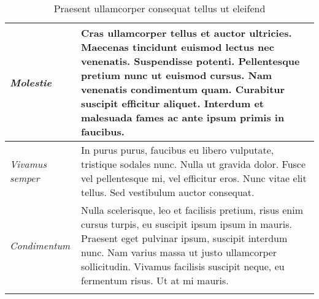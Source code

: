 \begin{center}
\begin{longtable}{ | p{} | p{} | }
		\emph{Molestie}
		& Cras ullamcorper tellus et auctor ultricies. Maecenas tincidunt euismod lectus nec venenatis. Suspendisse potenti. Pellentesque pretium nunc ut euismod cursus. Nam venenatis condimentum quam. Curabitur suscipit efficitur aliquet. Interdum et malesuada fames ac ante ipsum primis in faucibus.
		\\ \hline
		
		\emph{Vivamus semper}
		& In purus purus, faucibus eu libero vulputate, tristique sodales nunc. Nulla ut gravida dolor. Fusce vel pellentesque mi, vel efficitur eros. Nunc vitae elit tellus. Sed vestibulum auctor consequat. 
		\\ \hline
		
		\emph{Condimentum}
		& Nulla scelerisque, leo et facilisis pretium, risus enim cursus turpis, eu suscipit ipsum ipsum in mauris. Praesent eget pulvinar ipsum, suscipit interdum nunc. Nam varius massa ut justo ullamcorper sollicitudin. Vivamus facilisis suscipit neque, eu fermentum risus. Ut at mi mauris.
		\\ \hline
		
		\caption{Praesent ullamcorper consequat tellus ut eleifend}
		\label{tab:example-3}		
	\end{longtable}
\end{center}
\fi